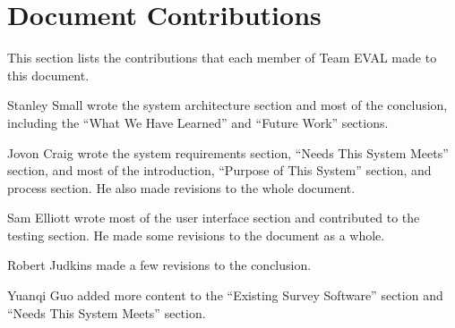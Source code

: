 \documentclass{article}
\begin{document}
\newpage
\appendix

\section{Document Contributions}

This section lists the contributions that each member of Team EVAL made to this document.

\medskip

Stanley Small wrote the system architecture section and most of the conclusion, including the ``What We Have Learned'' and ``Future Work'' sections.

Jovon Craig wrote the system requirements section, ``Needs This System Meets'' section, and most of the introduction, ``Purpose of This System'' section, and process section. He also made revisions to the whole document.

Sam Elliott wrote most of the user interface section and contributed to the testing section. He made some revisions to the document as a whole.

Robert Judkins made a few revisions to the conclusion.

Yuanqi Guo added more content to the ``Existing Survey Software'' section and ``Needs This System Meets'' section. 

\newpage




\newpage




\newpage




\newpage



\end{document}
